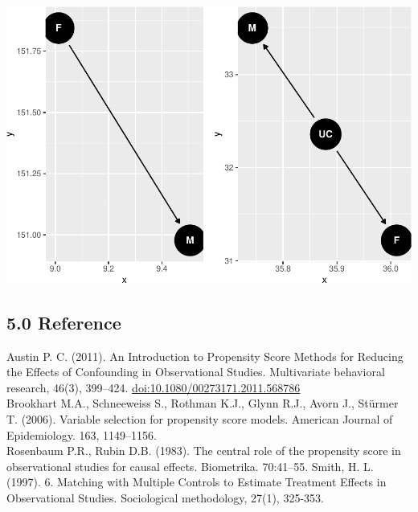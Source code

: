\documentclass[]{article}
\begin{document}
\includegraphics{Project3_Rongkui_files/figure-latex/unnamed-chunk-17-1.pdf}

\hypertarget{reference}{%
\subsection{5.0 Reference}\label{reference}}

Austin P. C. (2011). An Introduction to Propensity Score Methods for Reducing the Effects of Confounding in Observational Studies. Multivariate behavioral research, 46(3), 399--424. \url{doi:10.1080/00273171.2011.568786}\\
Brookhart M.A., Schneeweiss S., Rothman K.J., Glynn R.J., Avorn J., Stürmer T. (2006). Variable selection for propensity score models. American Journal of Epidemiology. 163, 1149--1156.\\
Rosenbaum P.R., Rubin D.B. (1983). The central role of the propensity score in observational studies for causal effects. Biometrika. 70:41--55.
Smith, H. L. (1997). 6. Matching with Multiple Controls to Estimate Treatment Effects in Observational Studies. Sociological methodology, 27(1), 325-353.
\end{document}
